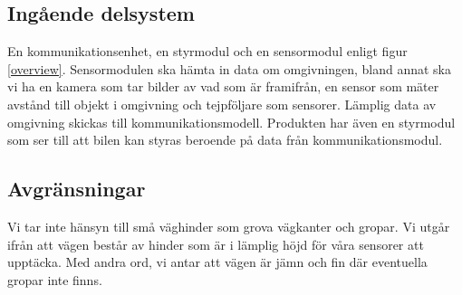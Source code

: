 \documentclass[krav.tex]{subfiles}
\begin{document}
\subsection{Ingående delsystem}
En kommunikationsenhet, en styrmodul och en sensormodul enligt figur \ref{overview}.
Sensormodulen ska hämta in data om omgivningen, bland annat ska vi 
ha en kamera som tar bilder av vad som är framifrån, en sensor som mäter
avstånd till objekt i omgivning och tejpföljare som sensorer. Lämplig data av omgivning skickas
till kommunikationsmodell. Produkten har även en styrmodul som 
ser till att bilen kan styras beroende på data från kommunikationsmodul.
\subsection{Avgränsningar}
Vi tar inte hänsyn till små väghinder som grova vägkanter och gropar.
Vi utgår ifrån att vägen består av hinder som är i lämplig höjd för våra sensorer att
upptäcka. Med andra ord, vi antar att vägen är jämn och fin där eventuella gropar inte finns.
\end{document}
